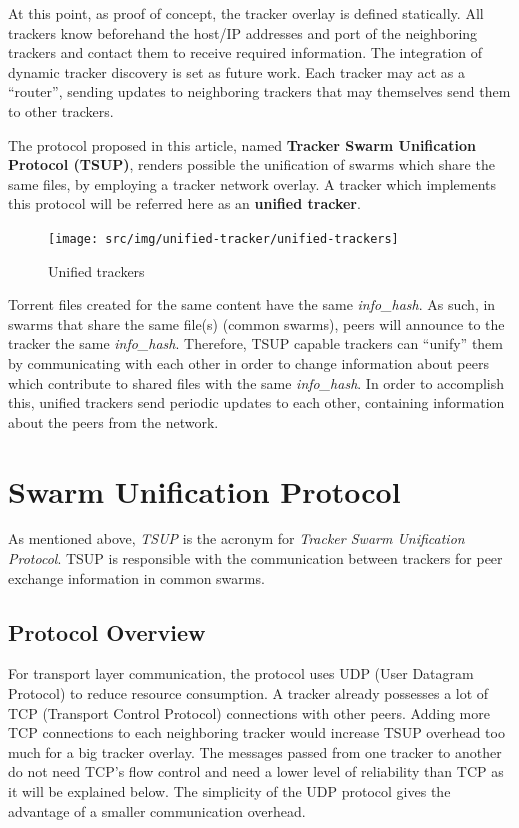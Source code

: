 At this point, as proof of concept, the tracker overlay is defined statically.
All trackers know beforehand the host/IP addresses and port of the neighboring
trackers and contact them to receive required information. The integration of
dynamic tracker discovery is set as future work. Each tracker may act as a
``router'', sending updates to neighboring trackers that may themselves send
them to other trackers.

The protocol proposed in this article, named \textbf{Tracker Swarm Unification
Protocol (TSUP)}, renders possible the unification of swarms which share
the same files, by employing a tracker network overlay. A tracker which
implements this protocol will be referred here as an \textbf{unified tracker}.

\begin{figure}[h]
  \begin{center}
    \texttt{[image: src/img/unified-tracker/unified-trackers]}
  \end{center}
  \caption{Unified trackers}
  \label{fig:unified-tracker:unified-trackers}
\end{figure}

Torrent files created for the same content have the same \textit{info_hash}.
As such, in swarms that share the same file(s) (common swarms), peers will announce
to the tracker the same \textit{info_hash}. Therefore, TSUP capable trackers
can ``unify'' them by communicating with each other in order to change
information about peers which contribute to shared files with the same
\textit{info_hash}.  In order to accomplish this, unified trackers send
periodic updates to each other, containing information about the peers from
the network.

\section{Swarm Unification Protocol}
\label{sec:unified-tracker:swarm-unification}

As mentioned above, \textit{TSUP} is the acronym for \textit{Tracker Swarm
Unification Protocol}. TSUP is responsible with the communication between
trackers for peer exchange information in common swarms.

\subsection{Protocol Overview}
\label{subsec:unified-tracker:protocol-overview}

For transport layer communication, the protocol uses UDP (User Datagram
Protocol) to reduce resource consumption. A tracker already possesses a lot of
TCP (Transport Control Protocol) connections with other peers. Adding
more TCP connections to each neighboring tracker would increase TSUP overhead
too much for a big tracker overlay. The messages passed from one tracker to
another do not need TCP's flow control and need a lower level of reliability
than TCP as it will be explained below. The simplicity of the UDP protocol
gives the advantage of a smaller communication overhead.

